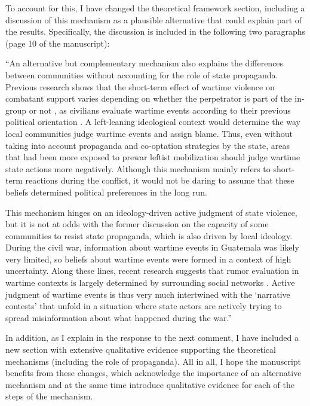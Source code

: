 \documentclass[12pt, a4paper, notitlepage]{article}
\begin{document}
To account for this, I have changed the theoretical framework section, including a discussion of this mechanism as a plausible alternative that could explain part of the results.
Specifically, the discussion is included in the following two paragraphs (page 10 of the manuscript):

``An alternative but complementary mechanism also explains the differences between communities without accounting for the role of state propaganda.
Previous research shows that the short-term effect of wartime violence on combatant support varies depending on whether the perpetrator is part of the in-group or not \citep{Lyall:2013aa}, as civilians evaluate wartime events according to their previous political orientation \citep{Pechenkina:2020ul, Silverman:2019aa}.
A left-leaning ideological context would determine the way local communities judge wartime events and assign blame.
Thus, even without taking into account propaganda and co-optation strategies by the state, areas that had been more exposed to prewar leftist mobilization should judge wartime state actions more negatively.
Although this mechanism mainly refers to short-term reactions during the conflict, it would not be daring to assume that these beliefs determined political preferences in the long run.

This mechanism hinges on an ideology-driven active judgment of state violence, but it is not at odds with the former discussion on the capacity of some communities to resist state propaganda, which is also driven by local ideology.
During the civil war, information about wartime events in Guatemala was likely very limited, so beliefs about wartime events were formed in a context of high uncertainty.
Along these lines, recent research suggests that rumor evaluation in wartime contexts is largely determined by surrounding social networks \citep{Schon:2021wf}.
Active judgment of wartime events is thus very much intertwined with the `narrative contests' that unfold in a situation where state actors are actively trying to spread misinformation about what happened during the war.''

In addition, as I explain in the response to the next comment, I have included a new section with extensive qualitative evidence supporting the theoretical mechanisms (including the role of propaganda). All in all, I hope the manuscript benefits from these changes, which acknowledge the importance of an alternative mechanism and at the same time introduce qualitative evidence for each of the steps of the mechanism.
\end{document}
